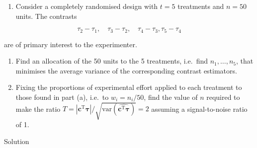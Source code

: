 \documentclass[
]{book}
\providecommand{\tightlist}{%
  \setlength{\itemsep}{0pt}\setlength{\parskip}{0pt}}
\theoremstyle{definition}
\theoremstyle{definition}
\theoremstyle{definition}
\theoremstyle{definition}
\theoremstyle{remark}
\begin{document}
\begin{enumerate}
\def\labelenumi{\arabic{enumi}.}
\setcounter{enumi}{3}
\tightlist
\item
  \citep[Adapted from][]{Morris2011} Consider a completely randomised design with \(t = 5\) treatments and \(n=50\) units. The contrasts
\end{enumerate}

\[
\tau_2 - \tau_1, \quad \tau_3 - \tau_2, \quad \tau_4 - \tau_3, \tau_5 - \tau_4
\]

are of primary interest to the experimenter.

\begin{enumerate}
\def\labelenumi{\alph{enumi}.}
\item
  Find an allocation of the 50 units to the 5 treatments, i.e.~find \(n_1, \ldots, n_5\), that minimises the average variance of the corresponding contrast estimators.
\item
  Fixing the proportions of experimental effort applied to each treatment to those found in part (a), i.e.~to \(w_i = n_i/50\), find the value of \(n\) required to make the ratio \(T = |\boldsymbol{c}^{\mathrm{T}}\boldsymbol{\tau}|/\sqrt{\mbox{var}\left(\widehat{\boldsymbol{c}^{\mathrm{T}}\boldsymbol{\tau}}\right)} = 2\) assuming a signal-to-noise ratio of 1.
\end{enumerate}

Solution
\end{document}
